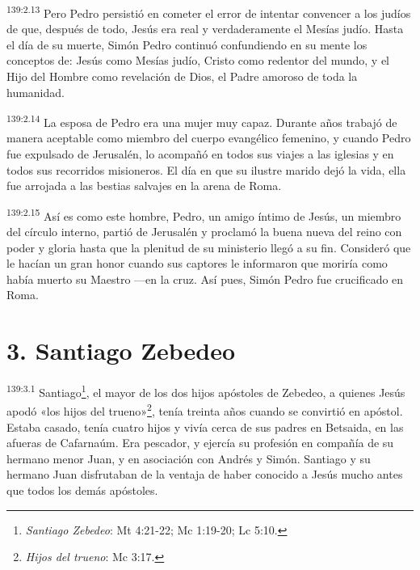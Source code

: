 \par 
\textsuperscript{139:2.13} Pero Pedro persistió en cometer el error de intentar convencer a los judíos de que, después de todo, Jesús era real y verdaderamente el Mesías judío. Hasta el día de su muerte, Simón Pedro continuó confundiendo en su mente los conceptos de: Jesús como Mesías judío, Cristo como redentor del mundo, y el Hijo del Hombre como revelación de Dios, el Padre amoroso de toda la humanidad.

\par 
\textsuperscript{139:2.14} La esposa de Pedro era una mujer muy capaz. Durante años trabajó de manera aceptable como miembro del cuerpo evangélico femenino, y cuando Pedro fue expulsado de Jerusalén, lo acompañó en todos sus viajes a las iglesias y en todos sus recorridos misioneros. El día en que su ilustre marido dejó la vida, ella fue arrojada a las bestias salvajes en la arena de Roma.

\par 
\textsuperscript{139:2.15} Así es como este hombre, Pedro, un amigo íntimo de Jesús, un miembro del círculo interno, partió de Jerusalén y proclamó la buena nueva del reino con poder y gloria hasta que la plenitud de su ministerio llegó a su fin. Consideró que le hacían un gran honor cuando sus captores le informaron que moriría como había muerto su Maestro ---en la cruz. Así pues, Simón Pedro fue crucificado en Roma.

\section*{3. Santiago Zebedeo}
\par 
\textsuperscript{139:3.1} Santiago\footnote{\textit{Santiago Zebedeo}: Mt 4:21-22; Mc 1:19-20; Lc 5:10.}, el mayor de los dos hijos apóstoles de Zebedeo, a quienes Jesús apodó «los hijos del trueno»\footnote{\textit{Hijos del trueno}: Mc 3:17.}, tenía treinta años cuando se convirtió en apóstol. Estaba casado, tenía cuatro hijos y vivía cerca de sus padres en Betsaida, en las afueras de Cafarnaúm. Era pescador, y ejercía su profesión en compañía de su hermano menor Juan, y en asociación con Andrés y Simón. Santiago y su hermano Juan disfrutaban de la ventaja de haber conocido a Jesús mucho antes que todos los demás apóstoles.

